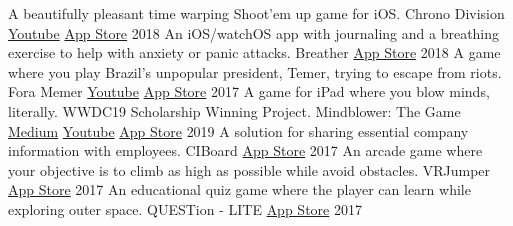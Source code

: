 

\begin{cventries}
  \cvcompactentry
    {A beautifully pleasant time warping Shoot'em up game for iOS.}
    {Chrono Division}
    {\href{https://www.youtube.com/watch?v=Wc9-ALdmvRw}{Youtube} \hspace{4pt} \href{https://itunes.apple.com/app/id1437675179}{App Store}}
    {2018}
  \cvcompactentry
    {An iOS/watchOS app with journaling and a breathing exercise to help with anxiety or panic attacks.}
    {Breather}
    {\href{https://itunes.apple.com/app/id1370659046}{App Store}}
    {2018}
  \cvcompactentry
    {A game where you play Brazil's unpopular president, Temer, trying to escape from riots.}
    {Fora Memer}
    {\href{https://youtu.be/YwVg7Yuu3pY}{Youtube} \hspace{4pt} \href{https://itunes.apple.com/br/app/fora-memer/id1253655537}{App Store}}
    {2017}
  \cvcompactentry
    {A game for iPad where you blow minds, literally. WWDC19 Scholarship Winning Project.}
    {Mindblower: The Game}
    {\href{https://medium.freecodecamp.org/how-i-won-a-scholarship-to-apples-yearly-event-for-the-second-time-f04f5f4636b1}{Medium} \hspace{4pt} \href{https://www.youtube.com/watch?v=xH9cn7BtG8k}{Youtube} \hspace{4pt} \href{https://itunes.apple.com/us/app/mindblower-the-game/id1460079689}{App Store}}
    {2019}
  \cvcompactentry
    {A solution for sharing essential company information with employees.}
    {CIBoard}
    {\href{https://itunes.apple.com/app/id1293364926}{App Store}}
    {2017}
  \cvcompactentry
    {An arcade game where your objective is to climb as high as possible while avoid obstacles.}
    {VRJumper}
    {\href{https://itunes.apple.com/app/id1262625055}{App Store}}
    {2017}
  \cvcompactentry
    {An educational quiz game where the player can learn while exploring outer space.}
    {QUESTion - LITE}
    {\href{https://itunes.apple.com/app/id1233411790}{App Store}}
    {2017}
\end{cventries}

